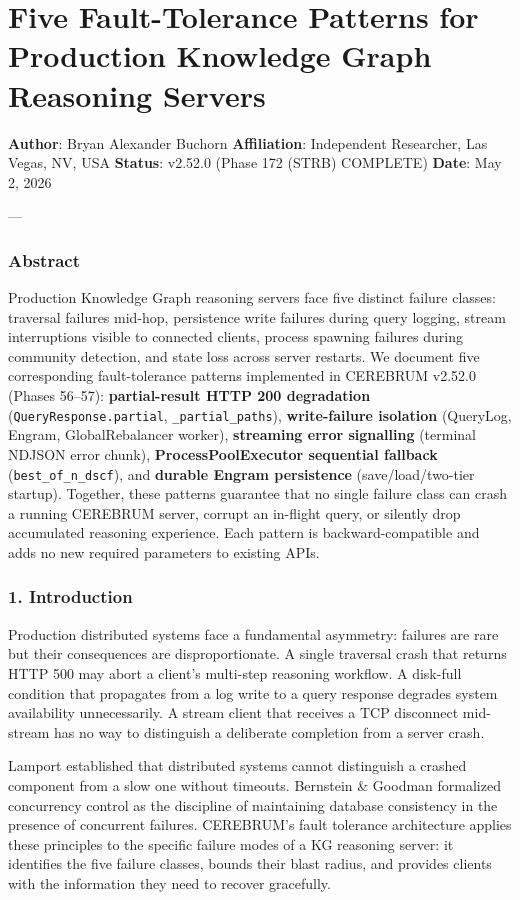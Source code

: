 \section{Five Fault-Tolerance Patterns for Production Knowledge Graph Reasoning Servers}

\textbf{Author}: Bryan Alexander Buchorn  
\textbf{Affiliation}: Independent Researcher, Las Vegas, NV, USA  
\textbf{Status}: v2.52.0 (Phase 172 (STRB) COMPLETE)
\textbf{Date}: May 2, 2026

---

\subsubsection{Abstract}
Production Knowledge Graph reasoning servers face five distinct failure classes: traversal failures mid-hop, persistence write failures during query logging, stream inter\-ruptions visible to connected clients, process spawning failures during community detection, and state loss across server restarts. We document five corre\-sponding fault-tolerance patterns implemented in CEREBRUM v2.52.0 (Phases 56–57): \textbf{partial-result HTTP 200 degradation} (\texttt{QueryResponse.partial}, \texttt{\_partial\_paths}), \textbf{write-failure isolation} (QueryLog, Engram, GlobalRebalancer worker), \textbf{streaming error signalling} (terminal NDJSON error chunk), \textbf{ProcessPoolExecutor sequential fallback} (\texttt{best\_of\_n\_dscf}), and \textbf{durable Engram persistence} (save/load/two-tier startup). Together, these patterns guarantee that no single failure class can crash a running CEREBRUM server, corrupt an in-flight query, or silently drop accumulated reasoning experience. Each pattern is backward-compatible and adds no new required parameters to existing APIs.

\subsubsection{1. Introd\-uction}
Production distributed systems face a fundamental asymmetry: failures are rare but their conse\-quences are dispr\-oportionate. A single traversal crash that returns HTTP 500 may abort a client's multi-step reasoning workflow. A disk-full condition that propagates from a log write to a query response degrades system avail\-ability unnec\-essarily. A stream client that receives a TCP disconnect mid-stream has no way to distinguish a deliberate completion from a server crash.

Lamport \cite{lamport1978} established that distributed systems cannot distinguish a crashed component from a slow one without timeouts. Bernstein \& Goodman \cite{bernstein1983} formalized concurrency control as the discipline of maintaining database consistency in the presence of concurrent failures. CEREBRUM's fault tolerance archi\-tecture applies these principles to the specific failure modes of a KG reasoning server: it identifies the five failure classes, bounds their blast radius, and provides clients with the information they need to recover gracefully.

